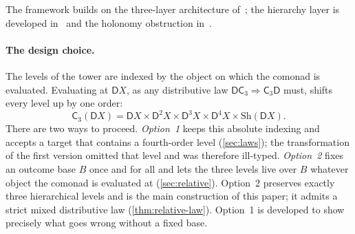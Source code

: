 \documentclass[11pt]{article}
\theoremstyle{definition}
\theoremstyle{remark}
\newcommand{\D}{\mathsf{D}}
\newcommand{\Sh}{\mathrm{Sh}}
\newcommand{\C}{\mathsf{C}}
\begin{document}
The framework builds on the three-layer architecture of~\cite{Awasthi-ThreeLayers}; the hierarchy
layer is developed in~\cite{Awasthi-Hierarchy} and the holonomy obstruction
in~\cite{Awasthi-Holonomy}.

\paragraph{The design choice.} The levels of the tower are indexed by the object on which the
comonad is evaluated. Evaluating at $\D X$, as any distributive law $\D\C_3\Rightarrow\C_3\D$ must,
shifts every level up by one order:
\[
\C_3(\D X)=\D X\times\D^2X\times\D^3X\times\D^4X\times\Sh(\D X).
\]
There are two ways to proceed. \emph{Option~1} keeps this absolute indexing and accepts a target that
contains a fourth-order level (\cref{sec:laws}); the transformation of the first version omitted that
level and was therefore ill-typed. \emph{Option~2} fixes an outcome base $B$ once and for all and lets
the three levels live over $B$ whatever object the comonad is evaluated at (\cref{sec:relative}).
Option~2 preserves exactly three hierarchical levels and is the main construction of this paper; it
admits a strict mixed distributive law (\cref{thm:relative-law}). Option~1 is developed to show
precisely what goes wrong without a fixed base.
\end{document}
